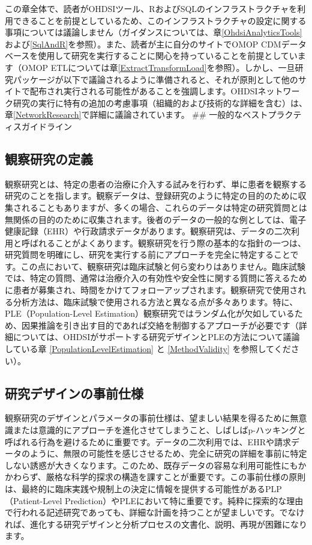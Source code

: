 \documentclass[
  11pt]{book}
\theoremstyle{definition}
\theoremstyle{definition}
\theoremstyle{definition}
\theoremstyle{definition}
\theoremstyle{remark}
\begin{document}
この章全体で、読者がOHDSIツール、RおよびSQLのインフラストラクチャを利用できることを前提としているため、このインフラストラクチャの設定に関する事項については議論しません（ガイダンスについては、章\ref{OhdsiAnalyticsTools}および\ref{SqlAndR}を参照）。また、読者が主に自分のサイトでOMOP CDMデータベースを使用して研究を実行することに関心を持っていることを前提としています（OMOP ETLについては章\ref{ExtractTransformLoad}を参照）。しかし、一旦研究パッケージが以下で議論されるように準備されると、それが原則として他のサイトで配布され実行される可能性があることを強調します。OHDSIネットワーク研究の実行に特有の追加の考慮事項（組織的および技術的な詳細を含む）は、章\ref{NetworkResearch}で詳細に議論されています。
\#\# 一般的なベストプラクティスガイドライン

\subsection{観察研究の定義}\label{ux89b3ux5bdfux7814ux7a76ux306eux5b9aux7fa9}

観察研究とは、特定の患者の治療に介入する試みを行わず、単に患者を観察する研究のことを指します。観察データは、登録研究のように特定の目的のために収集されることもありますが、多くの場合、これらのデータは特定の研究質問とは無関係の目的のために収集されます。後者のデータの一般的な例としては、電子健康記録（EHR）や行政請求データがあります。観察研究は、データの二次利用と呼ばれることがよくあります。観察研究を行う際の基本的な指針の一つは、研究質問を明確にし、研究を実行する前にアプローチを完全に特定することです。この点において、観察研究は臨床試験と何ら変わりはありません。臨床試験では、特定の質問、通常は治療介入の有効性や安全性に関する質問に答えるために患者が募集され、時間をかけてフォローアップされます。観察研究で使用される分析方法は、臨床試験で使用される方法と異なる点が多々あります。特に、PLE（Population-Level Estimation）観察研究ではランダム化が欠如しているため、因果推論を引き出す目的であれば交絡を制御するアプローチが必要です（詳細については、OHDSIがサポートする研究デザインとPLEの方法について議論している章 \ref{PopulationLevelEstimation} と \ref{MethodValidity} を参照してください）。

\subsection{研究デザインの事前仕様}\label{ux7814ux7a76ux30c7ux30b6ux30a4ux30f3ux306eux4e8bux524dux4ed5ux69d8}

観察研究のデザインとパラメータの事前仕様は、望ましい結果を得るために無意識または意識的にアプローチを進化させてしまうこと、しばしばp-ハッキングと呼ばれる行為を避けるために重要です。データの二次利用では、EHRや請求データのように、無限の可能性を感じさせるため、完全に研究の詳細を事前に特定しない誘惑が大きくなります。このため、既存データの容易な利用可能性にもかかわらず、厳格な科学的探求の構造を課すことが重要です。この事前仕様の原則は、最終的に臨床実践や規制上の決定に情報を提供する可能性があるPLP（Patient-Level Prediction）やPLEにおいて特に重要です。純粋に探索的な理由で行われる記述研究であっても、詳細な計画を持つことが望ましいです。でなければ、進化する研究デザインと分析プロセスの文書化、説明、再現が困難になります。
\end{document}
